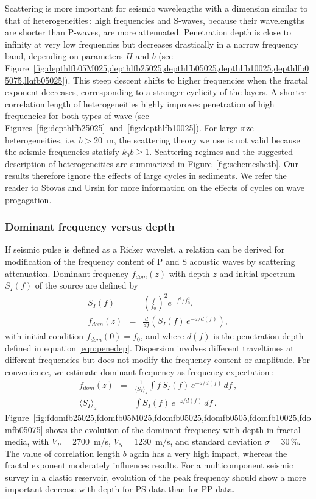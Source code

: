 Scattering is more important for seismic wavelengths with a dimension similar to that
of heterogeneities\,: high frequencies and S-waves, 
because their wavelengths are shorter than P-waves, are more attenuated.
Penetration depth is close to infinity at very low frequencies
but decreases drastically in a narrow frequency band, depending on parameters $H$ and $b$
(see Figure~\ref{fig:depthlfb05M025,depthlfb25025,depthlfb05025,depthlfb10025,depthlfb05075,llqfb05025}).
This steep descent shifts to higher frequencies 
when the fractal exponent decreases, corresponding to a stronger cyclicity of the layers.
A shorter correlation length of heterogeneities
highly improves penetration of high frequencies for both types of wave
(see Figures~\ref{fig:depthlfb25025}~and~\ref{fig:depthlfb10025}).
For large-size heterogeneities, i.e. $b>20$~m, 
the scattering theory we use is not valid because the seismic frequencies statisfy $k_0b\geq 1$.
Scattering regimes and the suggested description of heterogeneities
are summarized in Figure~\ref{fig:schemeshetb}.
Our results therefore ignore the effects of large cycles in sediments.
We refer the reader to Stovas and Ursin  for more information
on the effects of cycles on wave progagation.


\subsubsection{Dominant frequency versus depth}

If seismic pulse is defined as a Ricker wavelet, a relation can be derived for
modification of the frequency content of P and S acoustic waves by scattering attenuation. 
Dominant frequency $f_{{dom}}(z)$ with depth $z$ and initial spectrum $S_I(f)$ of the source are defined by
\begin{eqnarray}
S_I(f) & = & \left(\frac{f}{f_0}\right)^2e^{-f^2/f_0^2},\\
f_{{dom}}(z) & = & \frac{d}{df}\left(S_I(f)\,e^{-z/d(f)}\right),
\end{eqnarray}
with initial condition $f_{{dom}}(0)=f_0$, and where $d(f)$ is the penetration depth
defined in equation \ref{eqn:penedep}.
Dispersion involves different traveltimes
at different frequencies but does not modify the frequency content or amplitude.
For convenience, we estimate dominant frequency as frequency expectation\,:
\begin{eqnarray}
f_{{dom}}(z) & = & \frac{1}{\langle S_I \rangle_z}\int f\,S_I(f)\,e^{-z/d(f)}\,df\,,\\
\langle S_I \rangle_z & = & \int S_I(f)\,e^{-z/d(f)}\,df\,.
\end{eqnarray}
Figure~\ref{fig:fdomfb25025,fdomfb05M025,fdomfb05025,fdomfb0505,fdomfb10025,fdomfb05075}
shows the evolution of the dominant frequency with depth 
in fractal media, with $V_P=2700$~m/s, $V_S=1230$~m/s, and standard deviation $\sigma=30\,\%$.
The value of correlation length $b$ again has a very high impact,
whereas the fractal exponent moderately influences results.
For a multicomponent seismic survey in a clastic reservoir,
evolution of the peak frequency should show a more 
important decrease with depth for PS data than for PP data.


